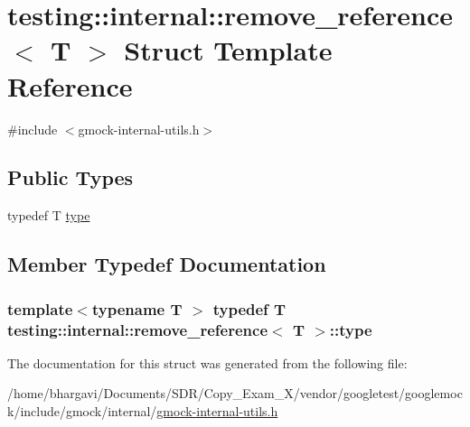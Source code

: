 \hypertarget{structtesting_1_1internal_1_1remove__reference}{}\section{testing\+:\+:internal\+:\+:remove\+\_\+reference$<$ T $>$ Struct Template Reference}
\label{structtesting_1_1internal_1_1remove__reference}


{\ttfamily \#include $<$gmock-\/internal-\/utils.\+h$>$}

\subsection*{Public Types}
\begin{DoxyCompactItemize}
\item 
typedef T \hyperlink{structtesting_1_1internal_1_1remove__reference_a291edca52c59a0d211977d4802439b8a}{type}
\end{DoxyCompactItemize}


\subsection{Member Typedef Documentation}
\subsubsection[{\texorpdfstring{type}{type}}]{\setlength{\rightskip}{0pt plus 5cm}template$<$typename T $>$ typedef T {\bf testing\+::internal\+::remove\+\_\+reference}$<$ T $>$\+::{\bf type}}\hypertarget{structtesting_1_1internal_1_1remove__reference_a291edca52c59a0d211977d4802439b8a}{}\label{structtesting_1_1internal_1_1remove__reference_a291edca52c59a0d211977d4802439b8a}


The documentation for this struct was generated from the following file\+:\begin{DoxyCompactItemize}
\item 
/home/bhargavi/\+Documents/\+S\+D\+R/\+Copy\+\_\+\+Exam\+\_\+X/vendor/googletest/googlemock/include/gmock/internal/\hyperlink{gmock-internal-utils_8h}{gmock-\/internal-\/utils.\+h}\end{DoxyCompactItemize}
